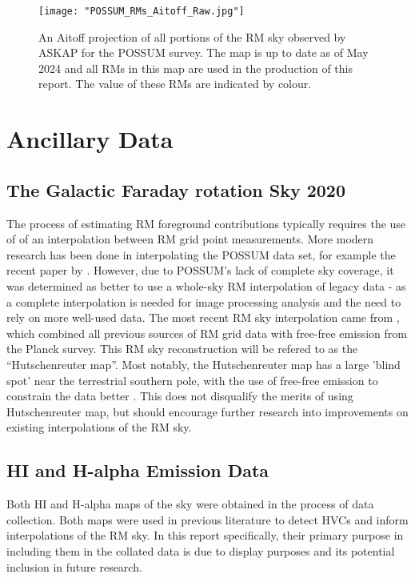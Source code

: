 \begin{figure}
    \texttt{[image: "POSSUM\_RMs\_Aitoff\_Raw.jpg"]}
    \centering
    \caption{An Aitoff projection of all portions of the RM sky observed by ASKAP for the POSSUM survey. The map is up to date as of May 2024 and all RMs in this map are used in the production of this report. The value of these RMs are indicated by colour.}
    \label{fig:rm_map}
\end{figure}

\section{Ancillary Data}
\label{sec:data}

\subsection{The Galactic Faraday rotation Sky 2020}
\label{ssec:legacy}

The process of estimating RM foreground contributions typically requires the use of of an interpolation between RM grid point measurements. More modern research has been done in interpolating the POSSUM data set, for example the recent paper by \cite{ID58}. However, due to POSSUM's lack of complete sky coverage, it was determined as better to use a whole-sky RM interpolation of legacy data - as a complete interpolation is needed for image processing analysis and the need to rely on more well-used data. The most recent RM sky interpolation came from \cite{ID44, ID45}, which combined all previous sources of RM grid data with free-free emission from the Planck survey. This RM sky reconstruction will be refered to as the “Hutschenreuter map”. Most notably, the Hutschenreuter map has a large 'blind spot' near the terrestrial southern pole, with the use of free-free emission to constrain the data better \citep{ID44, ID45}. This does not disqualify the merits of using Hutschenreuter map, but should encourage further research into improvements on existing interpolations of the RM sky.

\subsection{HI and H-alpha Emission Data}
\label{ssec:other_data}

Both HI and H-alpha maps of the sky were obtained in the process of data collection. Both maps were used in previous literature to detect HVCs and inform interpolations of the RM sky. In this report specifically, their primary purpose in including them in the collated data is due to display purposes and its potential inclusion in future research. 


